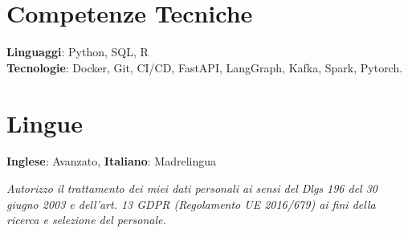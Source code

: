 
\section{Competenze Tecniche}
    \begin{itemize}[leftmargin=0.15in, label={}]
	\small{\item{
		\textbf{Linguaggi}{: Python, SQL, R} \\
		\textbf{Tecnologie}{: Docker, Git, CI/CD, FastAPI, LangGraph, Kafka, Spark, Pytorch.} \\}}
    \end{itemize}

\section{Lingue}
     \begin{itemize}[leftmargin=0.15in, label={}]
 	\small{\item{
 		\textbf{Inglese}: Avanzato, \textbf{Italiano}: Madrelingua }}
     \end{itemize}


\fontsize{6}{8}\textit{Autorizzo il trattamento dei miei dati personali ai sensi del Dlgs 196 del 30 giugno 2003 e dell’art. 13 GDPR (Regolamento UE 2016/679) ai fini della ricerca e selezione del personale.}